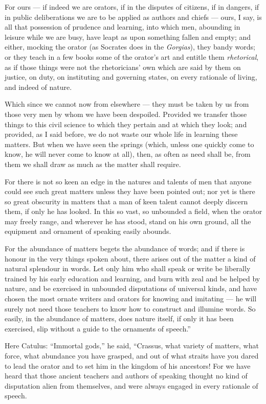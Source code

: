  For ours — if indeed we are orators, if in the disputes of citizens, if in dangers, if in public deliberations we are to be applied as authors and chiefs — ours, I say, is all that possession of prudence and learning, into which men, abounding in leisure while we are busy, have leapt as upon something fallen and empty; and either, mocking the orator (as Socrates does in the \textit{Gorgias}), they bandy words; or they teach in a few books some of the orator's art and entitle them \textit{rhetorical}, as if those things were not the rhetoricians' own which are said by them on justice, on duty, on instituting and governing states, on every rationale of living, and indeed of nature.

 Which since we cannot now from elsewhere — they must be taken by us from those very men by whom we have been despoiled. Provided we transfer those things to this civil science to which they pertain and at which they look; and provided, as I said before, we do not waste our whole life in learning these matters. But when we have seen the springs (which, unless one quickly come to know, he will never come to know at all), then, as often as need shall be, from them we shall draw as much as the matter shall require.

 For there is not so keen an edge in the natures and talents of men that anyone could see such great matters unless they have been pointed out; nor yet is there so great obscurity in matters that a man of keen talent cannot deeply discern them, if only he has looked. In this so vast, so unbounded a field, when the orator may freely range, and wherever he has stood, stand on his own ground, all the equipment and ornament of speaking easily abounds.

 For the abundance of matters begets the abundance of words; and if there is honour in the very things spoken about, there arises out of the matter a kind of natural splendour in words. Let only him who shall speak or write be liberally trained by his early education and learning, and burn with zeal and be helped by nature, and be exercised in unbounded disputations of universal kinds, and have chosen the most ornate writers and orators for knowing and imitating — he will surely not need those teachers to know how to construct and illumine words. So easily, in the abundance of matters, does nature itself, if only it has been exercised, slip without a guide to the ornaments of speech.''

 Here Catulus: ``Immortal gods,'' he said, ``Crassus, what variety of matters, what force, what abundance you have grasped, and out of what straits have you dared to lead the orator and to set him in the kingdom of his ancestors! For we have heard that those ancient teachers and authors of speaking thought no kind of disputation alien from themselves, and were always engaged in every rationale of speech.

